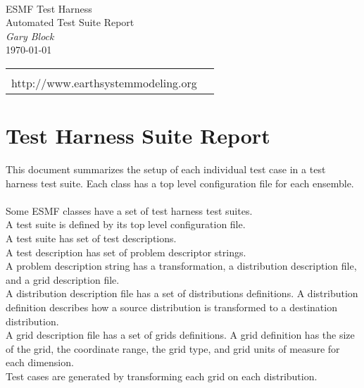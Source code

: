 \documentclass[english]{article}
\begin{document}
\begin{titlepage}
\begin{center}
\hspace{1in} \\
\vspace{1in}
{\Large ESMF Test Harness} \\
{\Large Automated Test Suite Report} \\
\medskip
{\it Gary Block} \\
\vspace{.5in}
{\large \today}
\end{center}

\vspace{4.0in}
\begin{tabular}{p{5in}p{.9in}}
\hrulefill \\
\noindent http://www.earthsystemmodeling.org \\
\end{tabular}

\end{titlepage}

\tableofcontents

\newpage

\section{Test Harness Suite Report}
This document summarizes the setup of each individual test case in a test harness test suite. 
Each class has a top level configuration file for each ensemble. \\ \\

Some ESMF classes have a set of test harness test suites. \\
A test suite is defined by its top level configuration file. \\
A test suite has set of test descriptions. \\
A test description has set of problem descriptor strings. \\
A problem description string has a transformation, a distribution description file,
and a grid description file. \\
A distribution description file has a set of distributions definitions.
A distribution definition describes how a source distribution is transformed 
to a destination distribution. \\
A grid description file has a set of grids definitions.
A grid definition has the size of the grid, the coordinate range, the grid type, and grid 
units of measure for each dimension. \\
Test cases are generated by transforming each grid on each distribution. \\
\end{document}
